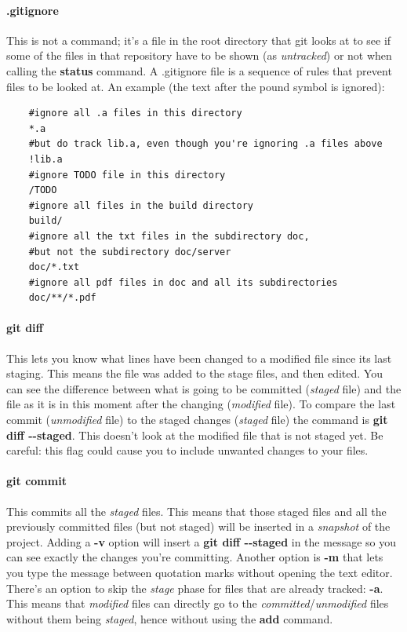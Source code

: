 \documentclass[a4paper, 12pt]{article}
\begin{document}
\paragraph{.gitignore}
This is not a command; it's a file in the root directory that git looks at to see if some of the files in that repository have to be shown (as \emph{untracked}) or not when calling the \textbf{status} command. A .gitignore file is a sequence of rules that prevent files to be looked at. An example (the text after the pound symbol is ignored):
\begin{verbatim}
	#ignore all .a files in this directory
	*.a
	#but do track lib.a, even though you're ignoring .a files above
	!lib.a
	#ignore TODO file in this directory
	/TODO
	#ignore all files in the build directory
	build/
	#ignore all the txt files in the subdirectory doc,
	#but not the subdirectory doc/server
	doc/*.txt
	#ignore all pdf files in doc and all its subdirectories
	doc/**/*.pdf	
\end{verbatim}

\paragraph{git diff} This lets you know what lines have been changed to a modified file since its last staging. This means the file was added to the stage files, and then edited. You can see the difference between what is going to be committed (\emph{staged} file) and the file as it is in this moment after the changing (\emph{modified} file). To compare the last commit (\emph{unmodified} file) to the staged changes (\emph{staged} file) the command is \textbf{git diff -{}-staged}. This doesn't look at the modified file that is not staged yet. Be careful: this flag could cause you to include unwanted changes to your files.

\paragraph{git commit} This commits all the \emph{staged} files. This means that those staged files and all the previously committed files (but not staged) will be inserted in a \emph{snapshot} of the project. Adding a \textbf{-v} option will insert a \textbf{git diff -{}-staged} in the message so you can see exactly the changes you're committing. Another option is \textbf{-m} that lets you type the message between quotation marks without opening the text editor. There's an option to skip the \emph{stage} phase for files that are already tracked: \textbf{-a}. This means that \emph{modified} files can directly go to the \emph{committed}/\emph{unmodified} files without them being \emph{staged}, hence without using the \textbf{add} command.
\end{document}
